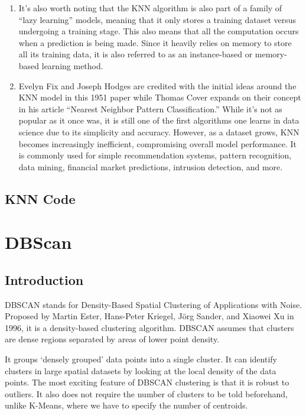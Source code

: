 \documentclass[10pt,a4paper]{book}
\begin{document}
\begin{enumerate}
    \item It's also worth noting that the KNN algorithm is also part of a family of “lazy learning” models, meaning that it only stores a training dataset versus undergoing a training stage. This also means that all the computation occurs when a prediction is being made. Since it heavily relies on memory to store all its training data, it is also referred to as an instance-based or memory-based learning method.
    
    \item Evelyn Fix and Joseph Hodges are credited with the initial ideas around the KNN model in this 1951 paper while Thomas Cover expands on their concept in his article “Nearest Neighbor Pattern Classification.” While it’s not as popular as it once was, it is still one of the first algorithms one learns in data science due to its simplicity and accuracy. However, as a dataset grows, KNN becomes increasingly inefficient, compromising overall model performance. It is commonly used for simple recommendation systems, pattern recognition, data mining, financial market predictions, intrusion detection, and more.      
\end{enumerate}
    
    \section{KNN Code}
    
    
    

\chapter{DBScan}


\section{Introduction}

DBSCAN stands for Density-Based Spatial Clustering of Applications with Noise. Proposed by Martin Ester, Hans-Peter Kriegel, Jörg Sander, and Xiaowei Xu in 1996, it is a density-based clustering algorithm. DBSCAN assumes that clusters are dense regions separated by areas of lower point density.


It groups ‘densely grouped’ data points into a single cluster. It can identify clusters in large spatial datasets by looking at the local density of the data points. The most exciting feature of DBSCAN clustering is that it is robust to outliers. It also does not require the number of clusters to be told beforehand, unlike K-Means, where we have to specify the number of centroids.
\end{document}
